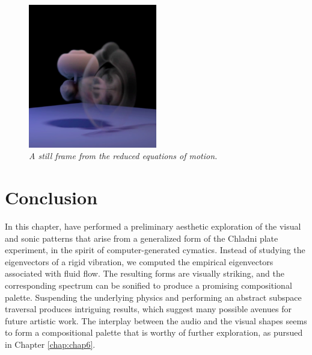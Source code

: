 \begin{figure}
	\centering
	\includegraphics[width=0.5\textwidth]{chap5/figures/reduced_grab.png}
	\caption{\em A still frame from the reduced equations of motion.}
	\label{fig:reduced}
\end{figure}


\section{Conclusion}
In this chapter, have performed a preliminary aesthetic exploration of the visual and sonic patterns that arise from a generalized form of the Chladni plate experiment, in the spirit of computer-generated cymatics. Instead of studying the eigenvectors of a rigid vibration, we computed the empirical eigenvectors associated with fluid flow. The resulting forms are visually striking, and the corresponding spectrum can be sonified to produce a promising compositional palette. Suspending the underlying physics and performing an abstract subspace traversal produces intriguing results, which suggest many possible avenues for future artistic work. The interplay between the audio and the visual shapes seems to form a compositional palette that is worthy of further exploration, as pursued in Chapter \ref{chap:chap6}.
